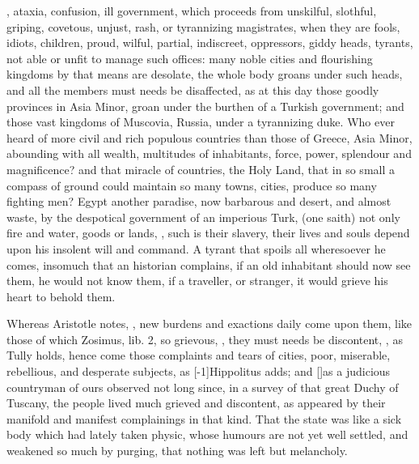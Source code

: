 , ataxia, confusion, ill government, which
proceeds from unskilful, slothful, griping, covetous, unjust, rash, or
tyrannizing magistrates, when they are fools, idiots, children, proud,
wilful, partial, indiscreet, oppressors, giddy heads, tyrants, not able
or unfit to manage such offices: many noble cities and flourishing
kingdoms by that means are desolate, the whole body groans under such
heads, and all the members must needs be disaffected, as at this day
those goodly provinces in Asia Minor, \etc{} groan under the burthen of a
Turkish government; and those vast kingdoms of Muscovia, Russia,
under a tyrannizing duke. Who ever heard of more civil and rich
populous countries than those of Greece, Asia Minor, abounding with all
wealth, multitudes of inhabitants, force, power, splendour and
magnificence? and that miracle of countries, the Holy Land, that
in so small a compass of ground could maintain so many towns, cities,
produce so many fighting men? Egypt another paradise, now barbarous and
desert, and almost waste, by the despotical government of an imperious
Turk,  (one saith) not only
fire and water, goods or lands, , such is their slavery, their lives and souls
depend upon his insolent will and command. A tyrant that spoils all
wheresoever he comes, insomuch that an historian complains, if an
old inhabitant should now see them, he would not know them, if a
traveller, or stranger, it would grieve his heart to behold them.

Whereas Aristotle notes, ,
new burdens and exactions daily come upon them, like those of which
Zosimus, lib. 2, so grievous, , they must needs be
discontent, , as  Tully holds,
hence come those complaints and tears of cities, poor, miserable,
rebellious, and desperate subjects, as [-1\baselineskip]Hippolitus adds; and
[\baselineskip]as a judicious countryman of ours observed not long since, in a
survey of that great Duchy of Tuscany, the people lived much grieved
and discontent, as appeared by their manifold and manifest complainings
in that kind. That the state was like a sick body which had lately
taken physic, whose humours are not yet well settled, and weakened so
much by purging, that nothing was left but melancholy.

